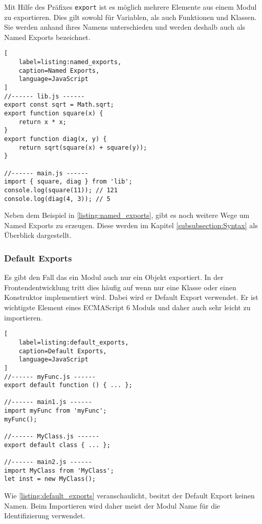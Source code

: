 Mit Hilfe des Präfixes \lstinline{export} ist es möglich mehrere Elemente aus einem Modul zu exportieren. Dies gilt sowohl für Variablen, als auch Funktionen und Klassen. Sie werden anhand ihres Namens unterschieden und werden deshalb auch als Named Exports bezeichnet. \autocite{AxelRauschmayer2014}

\begin{lstlisting}[
    label=listing:named_exports,
	caption=Named Exports,
	language=JavaScript
]
//------ lib.js ------
export const sqrt = Math.sqrt;
export function square(x) {
    return x * x;
}
export function diag(x, y) {
    return sqrt(square(x) + square(y));
}

//------ main.js ------
import { square, diag } from 'lib';
console.log(square(11)); // 121
console.log(diag(4, 3)); // 5
\end{lstlisting}

Neben dem Beispiel in \ref{listing:named_exports}, gibt es noch weitere Wege um Named Exports zu erzeugen. Diese werden im Kapitel \ref{subsubsection:Syntax} als Überblick dargestellt.

\subsubsection{Default Exports}
\label{subsubsection:default_exports}

Es gibt den Fall das ein Modul auch nur ein Objekt exportiert. In der Frontendentwicklung tritt dies häufig auf wenn nur eine Klasse oder einen Konstruktor implementiert wird. Dabei wird er Default Export verwendet. Er ist wichtigste Element eines ECMAScript 6 Moduls und daher auch sehr leicht zu importieren. \autocite{AxelRauschmayer2014}

\begin{lstlisting}[
    label=listing:default_exports,
	caption=Default Exports,
	language=JavaScript
]
//------ myFunc.js ------
export default function () { ... };

//------ main1.js ------
import myFunc from 'myFunc';
myFunc();

//------ MyClass.js ------
export default class { ... };

//------ main2.js ------
import MyClass from 'MyClass';
let inst = new MyClass();
\end{lstlisting}

Wie \ref{listing:default_exports} veranschaulicht, besitzt der Default Export keinen Namen. Beim Importieren wird daher meist der Modul Name für die Identifizierung verwendet.

